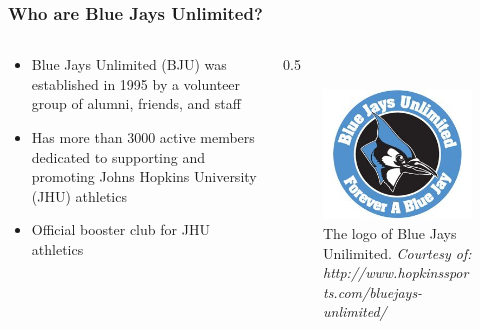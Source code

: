 \documentclass[compress,handout,10pt]{beamer}
\let\olditem\item
\renewcommand{\item}{\setlength{\itemsep}{0.5\baselineskip}\olditem}
\begin{document}
\begin{frame}
	\frametitle{Who are Blue Jays Unlimited?}
		\begin {columns}
			\begin{column}{0.5\textwidth}
				\begin {itemize}
					\item Blue Jays Unlimited (BJU) was established in 1995 \cite{bjuwebsite} by a volunteer group of alumni, friends, and staff
					\item Has more than 3000 active members dedicated to supporting and promoting Johns Hopkins University (JHU) athletics \cite{bjuwebsite}
					\item Official booster club for JHU athletics \cite{bjuwebsite}
				\end {itemize}
			\end {column}
			\begin {column}{0.5\textwidth}
				\begin{figure} [h]
					\begin{center}
						\includegraphics [width=2in] {BJU.jpg}
						\caption {{\tiny The logo of Blue Jays Unilimited. \textit{Courtesy of: http://www.hopkinssports.com/bluejays-unlimited/}}}
					\end{center}
				\end {figure}
			\end {column}
		\end{columns}
\end{frame}
\end{document}

